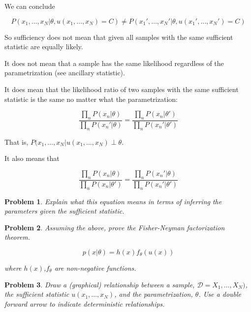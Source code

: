 \documentclass[a4paper]{article}
\newtheorem{problem}{Problem}[section]
\begin{document}
We can conclude

\begin{equation}
  P( x_1, \ldots, x_N \vert \theta, u(x_1,\ldots,x_N) = C ) \neq P( x_1', \ldots, x_N' \vert \theta, u(x_1',\ldots,x_N') = C )
  \label{}
\end{equation}

So sufficiency does not mean that given all samples with the same sufficient statistic are equally likely.

It does not mean that a sample has the same likelihood regardless of the parametrization (see ancillary statistic).

It does mean that the likelihood ratio of two samples with the same sufficient statistic is the same no matter what the parametrization:

\begin{equation}
  \frac{\prod_n P(x_n \vert \theta) }{ \prod_n P( x_n' \vert \theta) } = \frac{\prod_n P( x_n \vert \theta') }{ \prod_n P( x_n' \vert \theta') }
  \label{}
\end{equation}

That is, $P( x_1, \ldots, x_N \vert u(x_1, \ldots, x_N) \perp \theta $.

It also means that 

\begin{equation}
  \frac{\prod_n P(x_n \vert \theta) }{ \prod_n P( x_n \vert \theta') } = \frac{\prod_n P( x_n' \vert \theta) }{ \prod_n P( x_n' \vert \theta') }
  \label{}
\end{equation}

\begin{problem}
Explain what this equation means in terms of inferring the parameters given the sufficient statistic.
\end{problem}

\begin{problem}
Assuming the above, prove the Fisher-Neyman factorization theorem.

\begin{equation}
  p(x \vert \theta) = h(x) f_\theta( u(x) )
  \label{Fisher-Neyman factorization theorem}
\end{equation}

where $h(x)$,$f_\theta$ are non-negative functions.
\end{problem}

\begin{problem}
Draw a (graphical) relationship between a sample, $\mathcal{D} = X_1,\ldots,X_N)$, the sufficient statistic $u(x_1, \ldots, x_N)$, and the parametrization, $\theta$. 
Use a double forward arrow to indicate deterministic relationships.
\end{problem}
\end{document}
